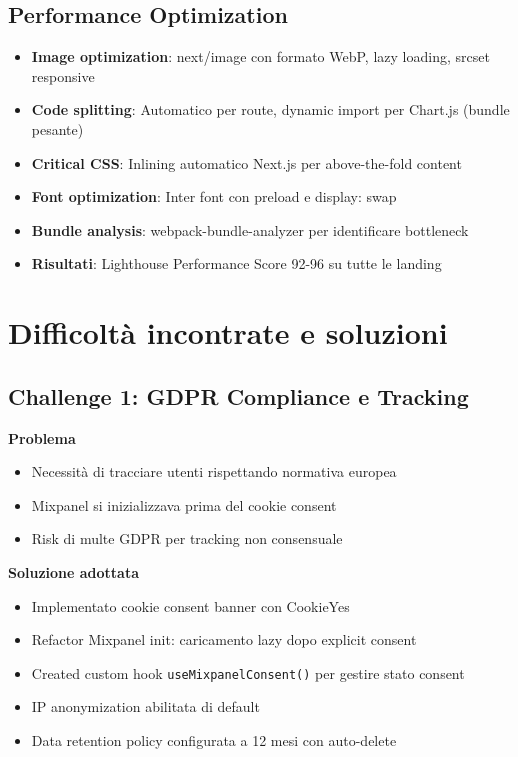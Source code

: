 \subsection{Performance Optimization}
\begin{itemize}
  \item \textbf{Image optimization}: next/image con formato WebP, 
        lazy loading, srcset responsive
  \item \textbf{Code splitting}: Automatico per route, dynamic import 
        per Chart.js (bundle pesante)
  \item \textbf{Critical CSS}: Inlining automatico Next.js per 
        above-the-fold content
  \item \textbf{Font optimization}: Inter font con preload e 
        display: swap
  \item \textbf{Bundle analysis}: webpack-bundle-analyzer per 
        identificare bottleneck
  \item \textbf{Risultati}: Lighthouse Performance Score 92-96 su 
        tutte le landing
\end{itemize}

\section{Difficoltà incontrate e soluzioni}

\subsection{Challenge 1: GDPR Compliance e Tracking}
\textbf{Problema}
\begin{itemize}
  \item Necessità di tracciare utenti rispettando normativa europea
  \item Mixpanel si inizializzava prima del cookie consent
  \item Risk di multe GDPR per tracking non consensuale
\end{itemize}

\textbf{Soluzione adottata}
\begin{itemize}
  \item Implementato cookie consent banner con CookieYes
  \item Refactor Mixpanel init: caricamento lazy dopo explicit consent
  \item Created custom hook \texttt{useMixpanelConsent()} per gestire 
        stato consent
  \item IP anonymization abilitata di default
  \item Data retention policy configurata a 12 mesi con auto-delete
\end{itemize}

